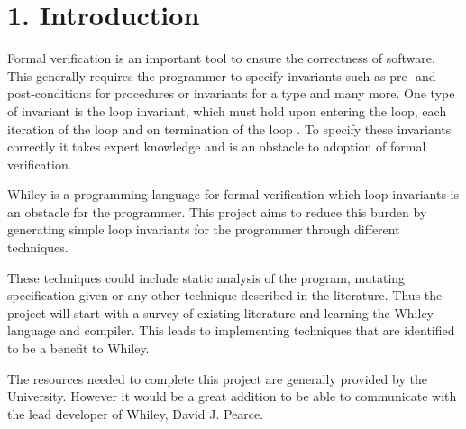 \documentclass[11pt, a4paper, twoside, openright]{report}
\begin{document}
\section*{1. Introduction}

%
%

Formal verification is an important tool to ensure the correctness of software.
This generally requires the programmer to specify invariants such as
pre- and post-conditions for procedures or invariants for a type and many more.
One type of invariant is the loop invariant,
which must hold upon entering the loop, each iteration of the loop 
and on termination of the loop \cite{invarints-classifiction}.
To specify these invariants correctly it takes expert knowledge and is an obstacle
to adoption of formal verification.

Whiley is a programming language for formal verification which loop invariants 
is an obstacle for the programmer. This project aims to reduce this 
burden by generating simple loop invariants for the programmer through different
techniques.

These techniques could include static analysis of the program, mutating specification
given or any other technique described in the literature. Thus the project
will start with a survey of existing literature and learning the Whiley language
and compiler. This leads to implementing techniques that are identified to be a
benefit to Whiley.

The resources needed to complete this project are generally provided by the University.
However it would be a great addition to be able to communicate with the lead developer
of Whiley, David J. Pearce.

\end{document}
